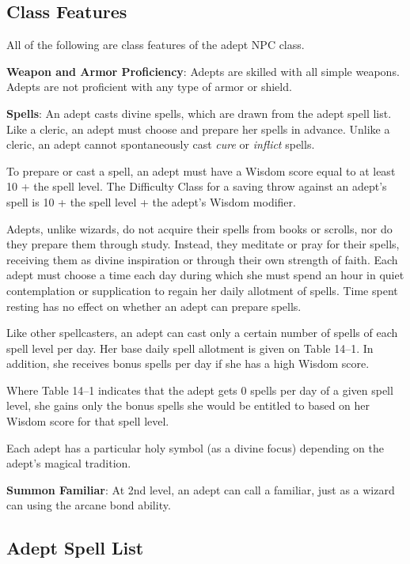 				
\subsection{Class Features}

				
All of the following are class features of the adept NPC class.
				
\textbf{Weapon and Armor Proficiency}: Adepts are skilled with all simple weapons. Adepts are not proficient with any type of armor or shield.
				
\textbf{Spells}: An adept casts divine spells, which are drawn from the adept spell list. Like a cleric, an adept must choose and prepare her spells in advance. Unlike a cleric, an adept cannot spontaneously cast \textit{cure} or \textit{inflict} spells.
				
To prepare or cast a spell, an adept must have a Wisdom score equal to at least 10 + the spell level. The Difficulty Class for a saving throw against an adept's spell is 10 + the spell level + the adept's Wisdom modifier.
				
Adepts, unlike wizards, do not acquire their spells from books or scrolls, nor do they prepare them through study. Instead, they meditate or pray for their spells, receiving them as divine inspiration or through their own strength of faith. Each adept must choose a time each day during which she must spend an hour in quiet contemplation or supplication to regain her daily allotment of spells. Time spent resting has no effect on whether an adept can prepare spells.
				
Like other spellcasters, an adept can cast only a certain number of spells of each spell level per day. Her base daily spell allotment is given on Table 14--1. In addition, she receives bonus spells per day if she has a high Wisdom score.
				
Where Table 14--1 indicates that the adept gets 0 spells per day of a given spell level, she gains only the bonus spells she would be entitled to based on her Wisdom score for that spell level.
				
Each adept has a particular holy symbol (as a divine focus) depending on the adept's magical tradition.
				
\textbf{Summon Familiar}: At 2nd level, an adept can call a familiar, just as a wizard can using the arcane bond ability.
				
\subsection{Adept Spell List}

